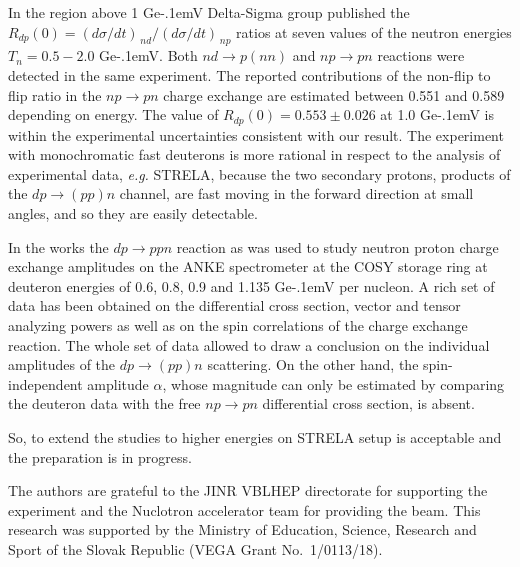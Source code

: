 \documentclass[twocolumn,epjc3]{svjour3}
\newcommand{\np}     {\ensuremath{np \rightarrow pn}\xspace}
\newcommand{\dpfrag} {\ensuremath{dp \rightarrow ppn}\xspace}
\newcommand{\dpchex} {\ensuremath{dp \rightarrow (pp)n}\xspace}
\newcommand{\GeV}    {Ge\kern-.1emV\xspace}
\begin{document}
In the region above 1 \GeV Delta-Sigma group published the
$R_{dp}(0) = (d\sigma/dt)_{\,nd} / (d\sigma/dt)_{\,np}$ ratios
\cite{sha09,sha09_2,shi11} at seven values of the neutron energies
$T_n = 0.5 - 2.0$ \GeV. Both $nd \rightarrow p(nn)$ and \np reactions were
detected in the same experiment. The reported contributions of the non-flip to
flip ratio in the \np charge exchange are estimated between 0.551 and 0.589
depending on energy. The value of $R_{dp}(0) = 0.553 \pm 0.026$ at 1.0 \GeV
\cite{sha09} is within the experimental uncertainties consistent with our
result. The experiment with monochromatic fast deuterons is more rational in
respect to the analysis of experimental data, \textit{e.g.} STRELA, because the
two secondary protons, products of the \dpchex channel, are fast moving in the
forward direction at small angles, and so they are easily detectable.

In the works \cite{chi09,mch13} the \dpfrag reaction as was used to study
neutron proton charge exchange amplitudes on the ANKE spectrometer at the COSY
storage ring at deuteron energies of 0.6, 0.8, 0.9 and 1.135 \GeV per nucleon.
A rich set of data has been obtained on the differential cross section, vector
and tensor analyzing powers as well as on the spin correlations of the charge
exchange reaction. The whole set of data allowed to draw a conclusion on the
individual amplitudes of the \dpchex scattering. On the other hand, the
spin-independent amplitude $\alpha$, whose magnitude can only be estimated by
comparing the deuteron data with the free \np differential cross section, is
absent.

So, to extend the studies to higher energies on STRELA setup is acceptable and
the preparation is in progress.

\begin{acknowledgements}
  The authors are grateful to the JINR VBLHEP directorate for supporting the
  experiment and the Nuclotron accelerator team for providing the beam. This
  research was supported by the Ministry of Education, Science, Research and
  Sport of the Slovak Republic (VEGA Grant No.~1/0113/18).
\end{acknowledgements}
\end{document}
